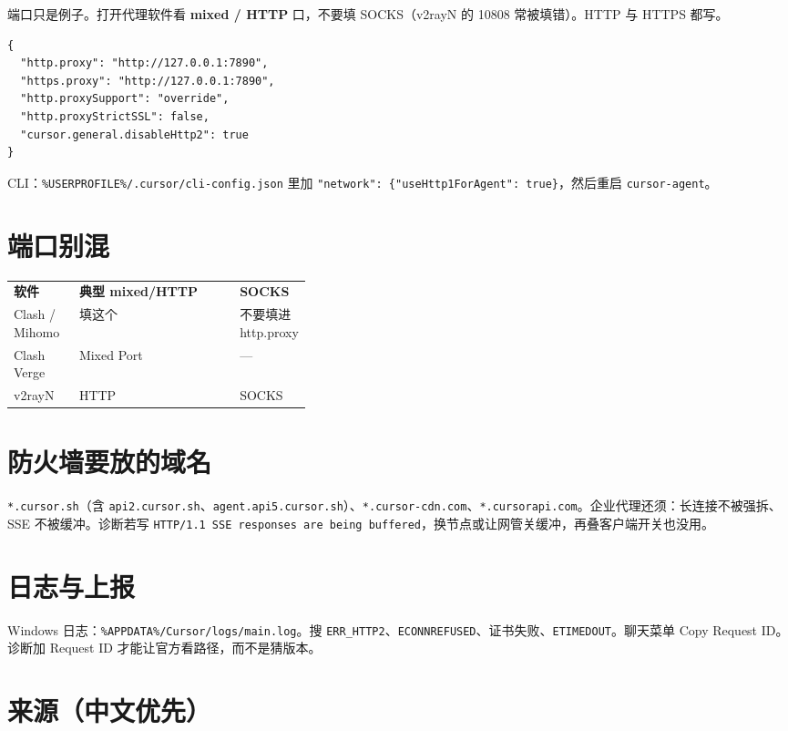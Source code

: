\documentclass[11pt,a4paper]{ctexart}
\makeatletter
\newcommand{\blocktable}[1]{%
\par
{\footnotesize
\noindent
\begin{tabularx}{\linewidth}{@{}
  >{\raggedright\arraybackslash}p{0.22\linewidth}
  >{\raggedright\arraybackslash}X
  >{\raggedright\arraybackslash}p{0.16\linewidth}@{}}
#1
\end{tabularx}}%
\par
}
\makeatother
\begin{document}
端口只是例子。打开代理软件看 \textbf{mixed / HTTP} 口，不要填 SOCKS（v2rayN 的 10808 常被填错）。HTTP 与 HTTPS 都写。

\begin{lstlisting}
{
  "http.proxy": "http://127.0.0.1:7890",
  "https.proxy": "http://127.0.0.1:7890",
  "http.proxySupport": "override",
  "http.proxyStrictSSL": false,
  "cursor.general.disableHttp2": true
}
\end{lstlisting}

CLI：\texttt{\%USERPROFILE\%/.cursor/cli-config.json} 里加 \texttt{"network": \{"useHttp1ForAgent": true\}}，然后重启 \texttt{cursor-agent}。

\section{端口别混}

\blocktable{
\rowcolor{yes}
\textbf{软件} & \textbf{典型 mixed/HTTP} & \textbf{SOCKS} \\
\addlinespace[0.1em]
Clash / Mihomo & 7890 填这个 & 7891 不要填进 http.proxy \\
Clash Verge & 7897 Mixed Port & --- \\
v2rayN & 10809 HTTP & 10808 SOCKS \\
}

\section{防火墙要放的域名}

\texttt{*.cursor.sh}（含 \texttt{api2.cursor.sh}、\texttt{agent.api5.cursor.sh}）、\texttt{*.cursor-cdn.com}、\texttt{*.cursorapi.com}。企业代理还须：长连接不被强拆、SSE 不被缓冲。诊断若写 \texttt{HTTP/1.1 SSE responses are being buffered}，换节点或让网管关缓冲，再叠客户端开关也没用。

\section{日志与上报}

Windows 日志：\texttt{\%APPDATA\%/Cursor/logs/main.log}。搜 \texttt{ERR\_HTTP2}、\texttt{ECONNREFUSED}、证书失败、\texttt{ETIMEDOUT}。聊天菜单 Copy Request ID。诊断加 Request ID 才能让官方看路径，而不是猜版本。

\section{来源（中文优先）}
\end{document}
